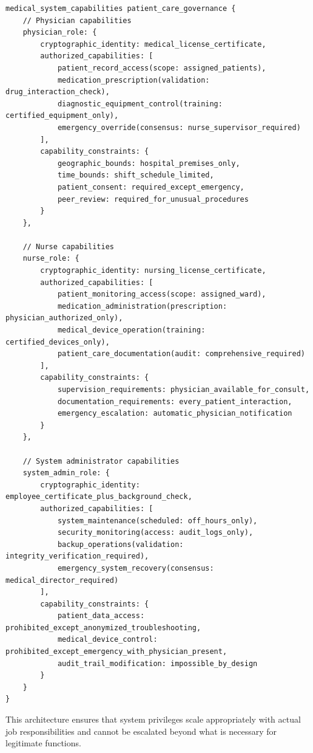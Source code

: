 \begin{lstlisting}[language=rift, caption=Cryptographic Capability Architecture for Medical Systems]
medical_system_capabilities patient_care_governance {
    // Physician capabilities
    physician_role: {
        cryptographic_identity: medical_license_certificate,
        authorized_capabilities: [
            patient_record_access(scope: assigned_patients),
            medication_prescription(validation: drug_interaction_check),
            diagnostic_equipment_control(training: certified_equipment_only),
            emergency_override(consensus: nurse_supervisor_required)
        ],
        capability_constraints: {
            geographic_bounds: hospital_premises_only,
            time_bounds: shift_schedule_limited,
            patient_consent: required_except_emergency,
            peer_review: required_for_unusual_procedures
        }
    },
    
    // Nurse capabilities  
    nurse_role: {
        cryptographic_identity: nursing_license_certificate,
        authorized_capabilities: [
            patient_monitoring_access(scope: assigned_ward),
            medication_administration(prescription: physician_authorized_only),
            medical_device_operation(training: certified_devices_only),
            patient_care_documentation(audit: comprehensive_required)
        ],
        capability_constraints: {
            supervision_requirements: physician_available_for_consult,
            documentation_requirements: every_patient_interaction,
            emergency_escalation: automatic_physician_notification
        }
    },
    
    // System administrator capabilities
    system_admin_role: {
        cryptographic_identity: employee_certificate_plus_background_check,
        authorized_capabilities: [
            system_maintenance(scheduled: off_hours_only),
            security_monitoring(access: audit_logs_only),
            backup_operations(validation: integrity_verification_required),
            emergency_system_recovery(consensus: medical_director_required)
        ],
        capability_constraints: {
            patient_data_access: prohibited_except_anonymized_troubleshooting,
            medical_device_control: prohibited_except_emergency_with_physician_present,
            audit_trail_modification: impossible_by_design
        }
    }
}
\end{lstlisting}

This architecture ensures that system privileges scale appropriately with actual job responsibilities and cannot be escalated beyond what is necessary for legitimate functions.

